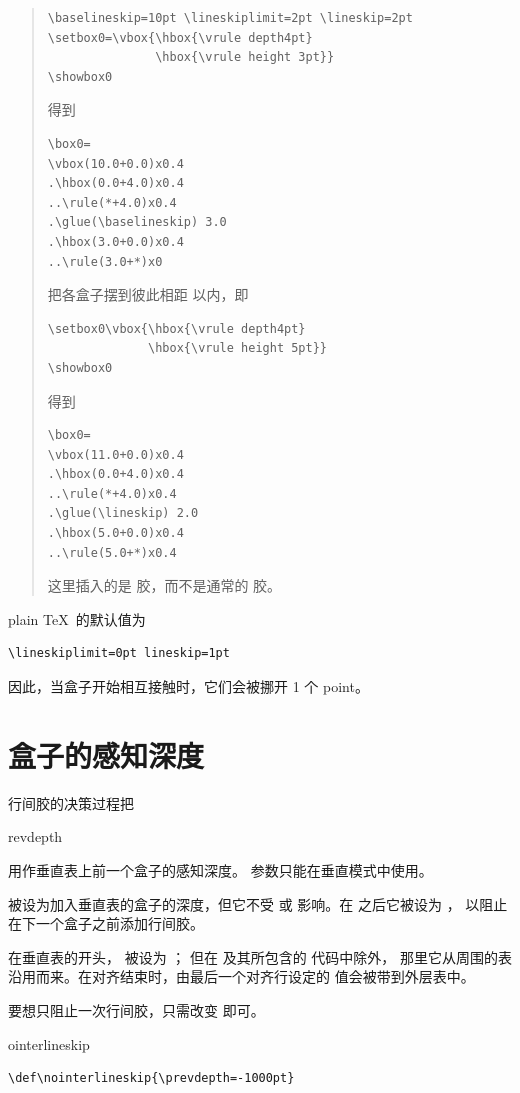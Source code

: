 \documentclass[a4paper]{rapport3}
\makeatletter
\newenvironment{example}{\begin{quotation}}{\end{quotation}}
\def\cstoidx#1\par{\index{#1@\cs{#1}}}
\def\csidx#1{\cstoidx #1\par\cs{#1}}
\makeatother
\begin{document}
\begin{example}\begin{verbatim}
\baselineskip=10pt \lineskiplimit=2pt \lineskip=2pt
\setbox0=\vbox{\hbox{\vrule depth4pt}
               \hbox{\vrule height 3pt}}
\showbox0
\end{verbatim}
得到\begin{verbatim}
\box0=
\vbox(10.0+0.0)x0.4
.\hbox(0.0+4.0)x0.4
..\rule(*+4.0)x0.4
.\glue(\baselineskip) 3.0
.\hbox(3.0+0.0)x0.4
..\rule(3.0+*)x0
\end{verbatim}
把各盒子摆到彼此相距  以内，即\begin{verbatim}
\setbox0\vbox{\hbox{\vrule depth4pt}
              \hbox{\vrule height 5pt}}
\showbox0
\end{verbatim}
得到\begin{verbatim}
\box0=
\vbox(11.0+0.0)x0.4
.\hbox(0.0+4.0)x0.4
..\rule(*+4.0)x0.4
.\glue(\lineskip) 2.0
.\hbox(5.0+0.0)x0.4
..\rule(5.0+*)x0.4
\end{verbatim}
这里插入的是  胶，而不是通常的  胶。
\end{example}

plain \TeX\ 的默认值为
\begin{verbatim}
\lineskiplimit=0pt lineskip=1pt
\end{verbatim}
因此，当盒子开始相互接触时，它们会被挪开 1 个 point。

\section{盒子的感知深度}

行间胶的决策过程把 \csidx{prevdepth} 用作垂直表上前一个盒子的感知深度。
 参数只能在垂直模式中使用。

 被设为加入垂直表的盒子的深度，但它不受 
或  影响。在  之后它被设为 \n{-1000pt}，
以阻止在下一个盒子之前添加行间胶。

在垂直表的开头， 被设为 \n{-1000pt}；
但在  及其所包含的  代码中除外，
那里它从周围的表沿用而来。在对齐结束时，由最后一个对齐行设定的
 值会被带到外层表中。

要想只阻止一次行间胶，只需改变  即可。
\cstoidx nointerlineskip\par
\begin{verbatim}
\def\nointerlineskip{\prevdepth=-1000pt}
\end{verbatim}
\end{document}
